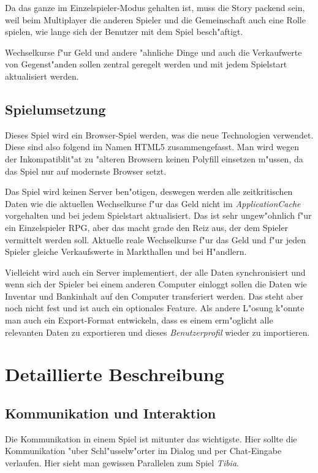 \documentclass[14pt]{book}
\begin{document}
Da das ganze im Einzelspieler-Modus gehalten ist, muss die Story packend sein, weil beim Multiplayer die anderen Spieler und die Gemeinschaft auch eine Rolle spielen, wie lange sich der Benutzer mit dem Spiel besch"aftigt.

Wechselkurse f"ur Geld und andere "ahnliche Dinge und auch die Verkaufwerte von Gegenst"anden sollen zentral geregelt werden und mit jedem Spielstart aktualisiert werden. 
 

\chapter{Spielumsetzung}

Dieses Spiel wird ein Browser-Spiel werden, was die neue Technologien verwendet. Diese sind also folgend im Namen HTML5 zusammengefasst. Man wird wegen der Inkompatiblit"at zu "alteren Browsern keinen Polyfill einsetzen m"ussen, da das Spiel nur auf modernste Browser setzt.

Das Spiel wird keinen Server ben"otigen, deswegen werden alle  zeitkritischen Daten wie die aktuellen Wechselkurse f"ur das Geld nicht im \emph{ApplicationCache} vorgehalten und bei jedem Spielstart aktualisiert. Das ist sehr ungew"ohnlich f"ur ein Einzelspieler RPG, aber das macht grade den Reiz aus, der dem Spieler vermittelt werden soll. Aktuelle reale Wechselkurse f"ur das Geld und f"ur jeden Spieler gleiche Verkaufswerte in Markthallen und bei H"andlern.

Vielleicht wird auch ein Server implementiert, der alle Daten synchronisiert und wenn sich der Spieler bei einem anderen Computer einloggt sollen die Daten wie Inventar und Bankinhalt auf den Computer transferiert werden. Das steht aber noch nicht fest und ist auch ein optionales Feature. Als andere L"osung k"onnte man auch ein Export-Format entwickeln, dass es einem erm"oglicht alle relevanten Daten zu exportieren und dieses \emph{Benutzerprofil} wieder zu importieren.


\part{Detaillierte Beschreibung}

\chapter{Kommunikation und Interaktion}

Die Kommunikation in einem Spiel ist mitunter das wichtigste. Hier sollte die Kommunikation "uber Schl"usselw"orter im Dialog und per Chat-Eingabe verlaufen. Hier sieht man gewissen Parallelen zum Spiel \emph{Tibia}. 
\end{document}
